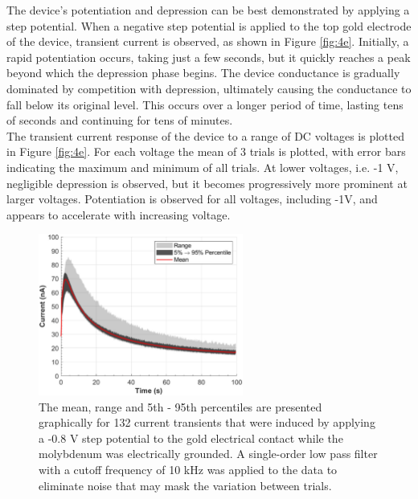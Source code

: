 \noindent The device's potentiation and depression can be best demonstrated by applying a step potential. When a negative step potential is applied to the top gold electrode of the device, transient current is observed, as shown in Figure \ref{fig:4e}. Initially, a rapid potentiation occurs, taking just a few seconds, but it quickly reaches a peak beyond which the depression phase begins. The device conductance is gradually dominated by competition with depression, ultimately causing the conductance to fall below its original level.  This occurs over a longer period of time, lasting tens of seconds and continuing for tens of minutes.\\

\noindent The transient current response of the device to a range of DC voltages is plotted in Figure \ref{fig:4e}. For each voltage the mean of 3 trials is plotted, with error bars indicating the maximum and minimum of all trials. At lower voltages, i.e. -1 V, negligible depression is observed, but it becomes progressively more prominent at larger voltages. Potentiation is observed for all voltages, including -1V, and appears to accelerate with increasing voltage.\\


\begin{figure}[htbp!] 
    \centering    
    \includegraphics[width=0.6\textwidth]{Chapter4/Figs/f.png}
    \caption[Repeatability of current transients in the sub-threshold range.]{The mean, range and 5th - 95th percentiles are presented graphically for 132 current transients that were induced by applying a -0.8 V step potential to the gold electrical contact while the molybdenum was electrically grounded. A single-order low pass filter with a cutoff frequency of 10 kHz was applied to the data to eliminate noise that may mask the variation between trials.}
    \label{fig:4f}
    \end{figure}
    
